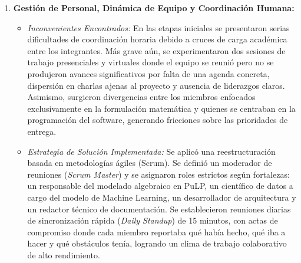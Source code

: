 \documentclass[11pt,a4paper]{article}
\begin{document}
\begin{enumerate}
    \item \textbf{Gestión de Personal, Dinámica de Equipo y Coordinación Humana:}
    \begin{itemize}
        \item \textit{Inconvenientes Encontrados:} En las etapas iniciales se presentaron serias dificultades de coordinación horaria debido a cruces de carga académica entre los integrantes. Más grave aún, se experimentaron dos sesiones de trabajo presenciales y virtuales donde el equipo se reunió pero no se produjeron avances significativos por falta de una agenda concreta, dispersión en charlas ajenas al proyecto y ausencia de liderazgos claros. Asimismo, surgieron divergencias entre los miembros enfocados exclusivamente en la formulación matemática y quienes se centraban en la programación del software, generando fricciones sobre las prioridades de entrega.
        \item \textit{Estrategia de Solución Implementada:} Se aplicó una reestructuración basada en metodologías ágiles (Scrum). Se definió un moderador de reuniones (\textit{Scrum Master}) y se asignaron roles estrictos según fortalezas: un responsable del modelado algebraico en PuLP, un científico de datos a cargo del modelo de Machine Learning, un desarrollador de arquitectura y un redactor técnico de documentación. Se establecieron reuniones diarias de sincronización rápida (\textit{Daily Standup}) de 15 minutos, con actas de compromiso donde cada miembro reportaba qué había hecho, qué iba a hacer y qué obstáculos tenía, logrando un clima de trabajo colaborativo de alto rendimiento.
    \end{itemize}


\end{enumerate}
\end{document}
